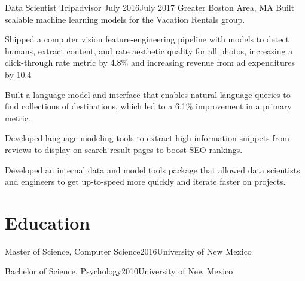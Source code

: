 \documentclass[print]{ag-cv} %
\begin{document}
\begin{job}
  {Data Scientist}
  {Tripadvisor}
  {July 2016}{July 2017}
  {Greater Boston Area, MA}
  {
  Built scalable machine learning models for the Vacation Rentals group.
  }
  {
  \begin{myitemize}
    \item Shipped a computer vision feature-engineering pipeline with models to
    detect humans, extract content, and rate aesthetic quality for all photos,
    increasing a click-through rate metric by 4.8\% and increasing revenue from
    ad expenditures by 10.4%
    
    \item Built a language model and interface that enables natural-language
    queries to find collections of destinations, which led to a 6.1\%
    improvement in a primary metric.
    
    \item Developed language-modeling tools to extract high-information snippets
    from reviews to display on search-result pages to boost SEO rankings.
    
    \item Developed an internal data and model tools package that allowed data
    scientists and engineers to get up-to-speed more quickly and iterate faster
    on projects.
\end{myitemize}
}
\end{job}


\section*{Education}
  \begin{edu}{Master of Science, Computer Science}{2016}{University of New Mexico}
  \end{edu}
  \begin{edu}{Bachelor of Science, Psychology}{2010}{University of New Mexico}
  \end{edu}


\end{document}
